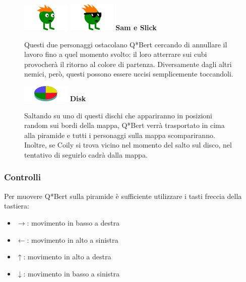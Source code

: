 \documentclass[a4paper,12pt, hidelinks]{report}
\begin{document}
\begin{figure}[H]
		\item
		\includegraphics[width=0.15\linewidth]{img/Sam}
		\includegraphics[width=0.15\linewidth]{img/Slick}
		\label{img:Sam&Slick}
		\textbf{Sam e Slick}
		
		Questi due personaggi ostacolano Q*Bert cercando di annullare il lavoro fino a quel momento svolto: il loro atterrare sui cubi provocherà il ritorno al colore di partenza. Diversamente dagli altri nemici, però, questi possono essere uccisi semplicemente toccandoli.
		
\end{figure}

\begin{figure}[H]
		\item
		\includegraphics[width=0.15\linewidth]{img/Disk}
		\label{img:Disk}
		\textbf{Disk}
		
		Saltando su uno di questi dischi che appariranno in posizioni random sui bordi della mappa, Q*Bert verrà trasportato in cima alla piramide e tutti i personaggi sulla mappa scompariranno. Inoltre, se Coily si trova vicino nel momento del salto sul disco, nel tentativo di seguirlo cadrà dalla mappa.
		
\end{figure}

\subsubsection{Controlli}

Per muovere Q*Bert sulla piramide è sufficiente utilizzare i tasti freccia della tastiera:

\begin{itemize}
	\item \textbf{$\rightarrow$}: movimento in basso a destra
	\item \textbf{$\leftarrow$}: movimento in alto a sinistra
	\item \textbf{$\uparrow$}: movimento in alto a destra
	\item \textbf{$\downarrow$}: movimento in basso a sinistra
\end{itemize}
\end{document}

